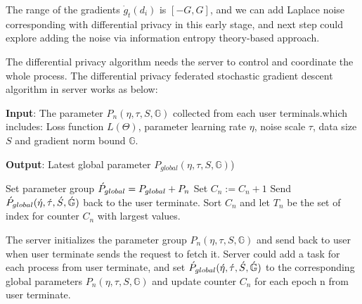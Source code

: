 \documentclass[journal,transmag]{IEEEtran}
\begin{document}
The range of the gradients $\dot{g}_t (d_i)$ is $[-G,G]$, and we can add Laplace noise corresponding with differential privacy in this early stage, and next step could explore adding the noise via information entropy theory-based approach. 

The differential privacy algorithm needs the server to control and coordinate the whole process. The differential privacy federated stochastic gradient descent algorithm in server works as below: 

\begin{algorithm}[ht]
\caption{Federated stochastic gradient descent algorithm in the server}
\label{alg:FederatedServer}
\hspace*{\algorithmicindent} 

\textbf{Input}: The parameter $P_n (\eta,\tau, S,\mathbb{G})$ collected from each user terminals.which includes: Loss function $L(\Theta)$, parameter learning rate $\eta$, noise scale $\tau$, data size $S$ and gradient norm bound $\mathbb{G}$.

\textbf{Output}:  Latest global parameter $P_{global} (\eta,\tau,S,\mathbb{G})$) \\

\begin{algorithmic}[1]

\State Set parameter group $\Acute{P}_{global}=P_{global}+P_n$
\State Set $C_n := C_n +1 $
\EndFor
\State Send $\Acute{P}_{global} (\Acute{\eta},\Acute{\tau},\Acute{S},\Acute{\mathbb{G}})$ back to the user terminate.
\State Sort $C_n$ and let $T_n$ be the set of index for counter $C_n$ with largest values.
\EndProcedure
\end{algorithmic}
\end{algorithm}

The server initializes the parameter group $P_n (\eta,\tau,S,\mathbb{G})$ and send back to user when user terminate sends the request to fetch it. Server could add a task for each process from user terminate, and set $\Acute{P}_{global} (\Acute{\eta},\Acute{\tau},\Acute{S},\Acute{\mathbb{G}})$ to the corresponding global parameters $P_n (\eta,\tau,S,\mathbb{G})$  and update counter $C_n$ for each epoch n from user terminate. 


\end{document}
